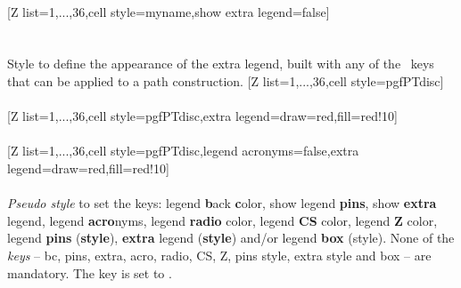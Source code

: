 \\ [10pt][Z list={1,...,36},cell style=myname,show extra legend=false]%
\\ [5pt]\makebox[\linewidth][c]{\scalebox{.6}{\pgfPT[Z list={1,...,36},cell style=myname,show extra legend=false]}}%
\\ [0pt]\pgfPTendoption%
\vfill%
\label{style_extra legend}%
%
{\ \\ [4pt]Style to define the appearance of the extra legend, built with any of the \txttikz\ keys that can be applied to a path construction.}%
\newpage%
[Z list={1,...,36},cell style=pgfPTdisc]%
\\ [10pt]\makebox[\linewidth][c]{\scalebox{.6}{\pgfPT[Z list={1,...,36},cell style=pgfPTdisc]}}%
\\ [10pt][Z list={1,...,36},cell style=pgfPTdisc,extra legend={draw=red,fill=red!10}]%
\\ [10pt]\makebox[\linewidth][c]{\scalebox{.6}{\pgfPT[Z list={1,...,36},cell style=pgfPTdisc,extra legend={draw=red,fill=red!10}]}}%
\\ [10pt][Z list={1,...,36},cell style=pgfPTdisc,legend acronyms=false,extra legend={draw=red,fill=red!10}]%
\\ [10pt]\makebox[\linewidth][c]{\scalebox{.6}{\pgfPT[Z list={1,...,36},cell style=pgfPTdisc,legend acronyms=false,extra legend={draw=red,fill=red!10}]}}%
\\ [0pt]\pgfPTendstyle%
\vfill%
\label{style_legend}%
%
{\textit{Pseudo style} to set the keys: legend \textbf{b}ack \textbf{c}olor, show legend \textbf{pins}, show \textbf{extra} legend, legend \textbf{acro}nyms, legend \textbf{radio} color, legend \textbf{CS} color, legend \textbf{Z} color, legend \textbf{pins} (\textbf{style}), \textbf{extra} legend (\textbf{style}) and/or legend \textbf{box} (style). None of the \textit{keys} -- bc, pins, extra, acro, radio, CS, Z, pins style, extra style and box -- are mandatory.
The key  is set to .
\\ [5pt]%
}%
